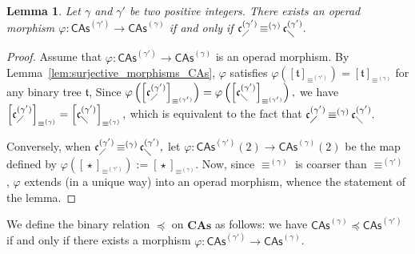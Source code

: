 \documentclass[10pt,reqno]{amsart}
\numberwithin{equation}{subsection}
\newtheorem{Lemma}[Theorem]{Lemma}
\newcommand{\Tfr}{\mathfrak{t}}
\newcommand{\CAs}[1]{\mathsf{CAs}^{(#1)}}
\newcommand{\CAsAll}{\mathbf{CAs}}
\newcommand{\LComb}[1]{\mathfrak{c}^{(#1)}_{\diagup}}
\newcommand{\RComb}[1]{\mathfrak{c}^{(#1)}_{\diagdown}}
\newcommand{\OrdCAs}{\preceq}
\DeclareMathOperator{\Product}{\star}
\DeclareMathOperator{\Congr}{\equiv}
\newcommand{\CongrCAs}[1]{\Congr^{(#1)}}
\begin{document}
\begin{Lemma} \label{lem:morphism_CAs}
    Let $\gamma$ and $\gamma'$ be two positive integers. There exists an
    operad morphism $\varphi:\CAs{\gamma'} \to \CAs{\gamma}$ if and only
    if
    \begin{math}
        \LComb{\gamma'} \CongrCAs{\gamma} \RComb{\gamma'}.
    \end{math}
\end{Lemma}
\begin{proof}
    Assume that $\varphi:\CAs{\gamma'} \to \CAs{\gamma}$ is an operad
    morphism. By Lemma~\ref{lem:surjective_morphisms_CAs}, $\varphi$
    satisfies
    \begin{math}
        \varphi\left(\left[\Tfr\right]_{\CongrCAs{\gamma'}}\right)
        = \left[\Tfr\right]_{\CongrCAs{\gamma}}
    \end{math}
    for any binary tree $\Tfr$,
    Since
    \begin{math}
        \varphi\left(
        \left[\LComb{\gamma'}\right]_{\CongrCAs{\gamma'}}
        \right)
        =
        \varphi\left(
        \left[\RComb{\gamma'}\right]_{\CongrCAs{\gamma'}}
        \right),
    \end{math}
    we have
    \begin{math}
        \left[\LComb{\gamma'}\right]_{\CongrCAs{\gamma}}
        =
        \left[\RComb{\gamma'}\right]_{\CongrCAs{\gamma}},
    \end{math}
    which is equivalent to the fact that
    \begin{math}
        \LComb{\gamma'} \CongrCAs{\gamma} \RComb{\gamma'}.
    \end{math}
    \smallbreak

    Conversely, when
    \begin{math}
        \LComb{\gamma'}\CongrCAs{\gamma}\RComb{\gamma'},
    \end{math}
    let $\varphi:\CAs{\gamma'}(2) \to \CAs{\gamma}(2)$ be the map
    defined by
    \begin{math}
        \varphi\left(
        \left[\Product\right]_{\CongrCAs{\gamma'}}\right)
        :=
        \left[\Product\right]_{\CongrCAs{\gamma}}.
    \end{math}
    Now, since $\CongrCAs{\gamma}$ is coarser than $\CongrCAs{\gamma'}$,
    $\varphi$ extends (in a unique way) into an operad morphism, whence
    the statement of the lemma.
\end{proof}
\medbreak

We define the binary relation $\OrdCAs$ on $\CAsAll$ as follows: we have
$\CAs{\gamma} \OrdCAs \CAs{\gamma'}$ if and only if there exists a
morphism $\varphi:\CAs{\gamma'} \to \CAs{\gamma}$.
\medbreak
\end{document}
